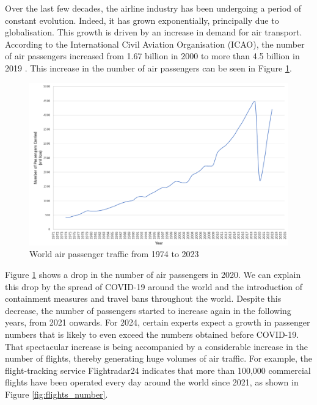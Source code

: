 \documentclass[12pt,oneside]{book} %
\begin{document}
\noindent Over the last few decades, the airline industry has been undergoing a period of constant evolution. Indeed, it has grown exponentially, principally due to globalisation. This growth is driven by an increase in demand for air transport. According to the International Civil Aviation Organisation (ICAO), the number of air passengers increased from 1.67 billion in 2000 to more than 4.5 billion in 2019 \cite{ICAO}. This increase in the number of air passengers can be seen in Figure \ref{fig:air_passengers}.

\begin{figure}[H]
 \begin{adjustwidth}{-1cm}{}
    \centering
    \includegraphics[width=1\linewidth]{Image/passengers.png}
     \end{adjustwidth}
    \caption{World air passenger traffic from 1974 to 2023 \cite{ICAO}}
    \label{fig:air_passengers}
\end{figure}

\noindent Figure \ref{fig:air_passengers} shows a drop in the number of air passengers in 2020. We can explain this drop by the spread of COVID-19 around the world and the introduction of containment measures and travel bans throughout the world. Despite this decrease, the number of passengers started to increase again in the following years, from 2021 onwards. For 2024, certain experts expect a growth in passenger numbers that is likely to even exceed the numbers obtained before COVID-19. That spectacular increase is being accompanied by a considerable increase in the number of flights, thereby generating huge volumes of air traffic. For example, the flight-tracking service Flightradar24 \cite{Flightradar24} indicates that more than 100,000 commercial flights have been operated every day around the world since 2021, as shown in Figure \ref{fig:flights_number}.
\end{document}
